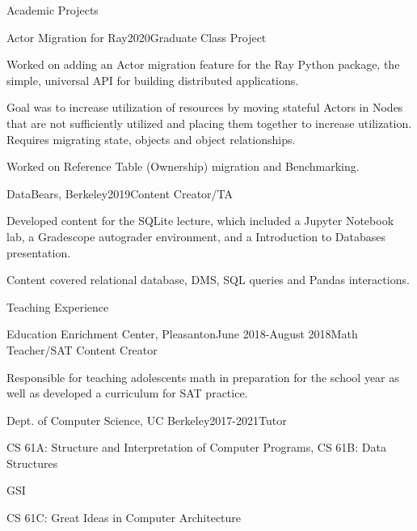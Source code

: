\documentclass{resume} %
\begin{document}
\begin{rSection}{Academic Projects}
\begin{rSubsection}{Actor Migration for Ray}{2020}{Graduate Class Project}{}
	\item Worked on adding an Actor migration feature for the Ray Python package, the simple, universal API for building distributed applications.
	\item Goal was to increase utilization of resources by moving stateful Actors in Nodes that are not sufficiently utilized and placing them together to increase utilization. Requires migrating state, objects and object relationships. 
	\item Worked on Reference Table (Ownership) migration and Benchmarking.
\end{rSubsection}

\begin{rSubsection}{DataBears, Berkeley}{2019}{Content Creator/TA}{}
    \item Developed content for the SQLite lecture, which included a Jupyter Notebook lab, a Gradescope autograder environment, and a Introduction to Databases presentation.
    \item Content covered relational database, DMS, SQL queries and Pandas interactions.
\end{rSubsection}    

\end{rSection}


\begin{rSection}{Teaching Experience} 
\begin{rSubsection}{Education Enrichment Center, Pleasanton}{June 2018-August 2018}{Math Teacher/SAT Content Creator}{}
\item Responsible for teaching adolescents math in preparation for the school year as well as developed a curriculum for SAT practice.
\end{rSubsection}

\begin{rSubsection}{Dept. of Computer Science, UC Berkeley}{2017-2021}{Tutor}{}
\item CS 61A: Structure and Interpretation of Computer Programs, CS 61B: Data Structures
\end{rSubsection}

\begin{rSubsubsection}{GSI}{}
\item CS 61C: Great Ideas in Computer Architecture
\end{rSubsubsection}

\end{rSection}
\end{document}
